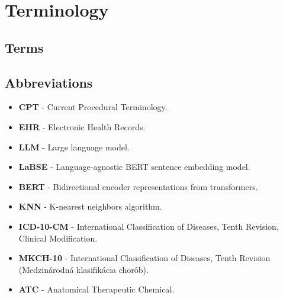 
\chapter*{Terminology}

\section*{Terms}

    \setlength\itemsep{1px}

\section*{Abbreviations}

\begin{itemize}
    \setlength\itemsep{1px}
    \item \textbf{CPT} - Current Procedural Terminology.
    \item \textbf{EHR} - Electronic Health Records.
    \item \textbf{LLM} - Large language model. 
    \item \textbf{LaBSE} - Language-agnostic BERT sentence embedding model.
    \item \textbf{BERT} - Bidirectional encoder representations from transformers.
    \item \textbf{KNN} - K-nearest neighbors algorithm.
    \item \textbf{ICD-10-CM} - International Classification of Diseases, Tenth Revision, Clinical Modification.
    \item \textbf{MKCH-10} - International Classification of Diseases, Tenth Revision (Medzinárodná klasifikácia chorôb).
    \item \textbf{ATC} - Anatomical Therapeutic Chemical.
\end{itemize}



